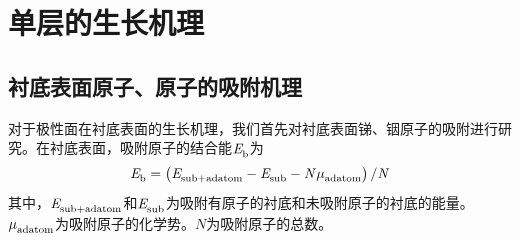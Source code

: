 \section{单层的生长机理}

\subsection{衬底表面原子、原子的吸附机理}
\def\TfourSite{\rm T_{4} \it}
\def\HthreeSite{\rm H_{3} \it}
\def\mievpas{\milli\electronvolt\per\angstrom\squared}
\def\InSbMLpolar#1#2{\rm #1-In/#2-Sb}
\def\NumOfAdatom{\it N_{\rm adatoms} \it}
\def\CNinNsb#1#2#3#4{\rm #1/#2{}_{#3InV}^{#4SbT} \it}

对于极性面在衬底表面的生长机理，我们首先对衬底表面锑、铟原子的吸附进行研究。在衬底表面，吸附原子的结合能$\it E_{\rm b}^{\rm } \it$为\chinesecolon
\[
    \it E_{\rm b}^{\rm } \it=\left(\it E_{\rm sub+adatom}^{\rm } \it-\it E_{\rm sub}^{\rm } \it-N\it \mu_{\rm adatom}^{\rm } \it\right)/ N
\]
其中，$\it E_{\rm sub+adatom}^{\rm } \it$和$\it E_{\rm sub}^{\rm } \it$为吸附有原子的衬底和未吸附原子的衬底的能量。$\it \mu_{\rm adatom}^{\rm } \it$为吸附原子的化学势。$N$为吸附原子的总数。

